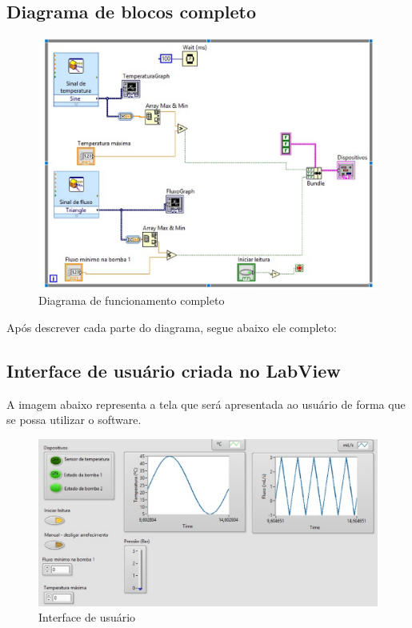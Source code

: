 \subsection{Diagrama de blocos completo}
\newpage
\begin{figure}[!htb]                                                               
    \centering                                                                      
    \includegraphics[scale=0.5, keepaspectratio=true]{figuras/detalhado/completo.eps} 
    \caption{Diagrama de funcionamento completo}
 \end{figure}

Após descrever cada parte do diagrama, segue abaixo ele completo:


\subsection{Interface de usuário criada no LabView}

A imagem abaixo representa a tela que será apresentada ao usuário de forma que se possa utilizar o software.

\begin{figure}[!htb]                                                               
    \centering                                                                      
    \includegraphics[scale=0.4, keepaspectratio=true]{figuras/detalhado/userinterface.eps} 
    \caption{Interface de usuário}
 \end{figure}